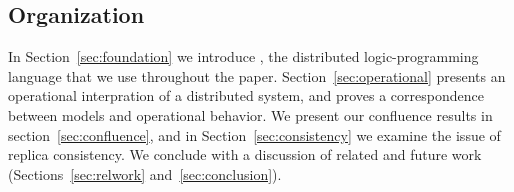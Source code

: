 \subsection{Organization}
In Section~\ref{sec:foundation} we introduce \lang, the distributed logic-programming language that we use throughout the paper.  Section~\ref{sec:operational} presents an operational interpration of a distributed system, and proves a correspondence between \lang models and operational behavior.  We present our confluence results in section~\ref{sec:confluence}, and in Section~\ref{sec:consistency} we examine the issue of replica consistency.  We conclude with a discussion of related and future work (Sections~\ref{sec:relwork} and~\ref{sec:conclusion}).
